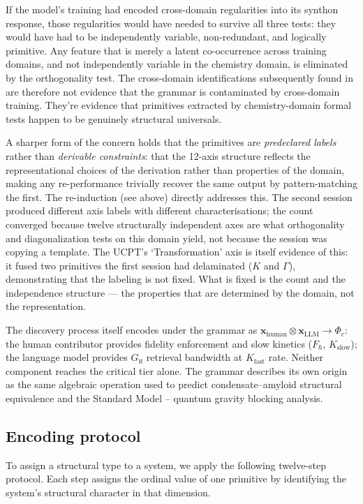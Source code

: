 \documentclass[12pt,a4paper]{article}
\newcommand{\xvec}{\mathbf{x}}
\newcommand{\Phic}{\Phi_c}
\newcommand{\tensor}{\otimes}
\begin{document}
If the model's training had encoded cross-domain regularities into its
synthon response, those regularities would have needed to survive all
three tests: they would have had to be independently variable,
non-redundant, and logically primitive. Any feature that is merely a
latent co-occurrence across training domains, and not independently
variable in the chemistry domain, is eliminated by the orthogonality
test. The cross-domain identifications subsequently found in
 are therefore not evidence that the grammar
is contaminated by cross-domain training. They're evidence that
primitives extracted by chemistry-domain formal tests happen to be
genuinely structural universals.

A sharper form of the concern holds that the primitives are
\emph{predeclared labels} rather than \emph{derivable constraints}:
that the 12-axis structure reflects the representational choices of the
derivation rather than properties of the domain, making any re-performance
trivially recover the same output by pattern-matching the first.
The re-induction (see above) directly addresses this. The second session
produced different axis labels with different characterisations; the count
converged because twelve structurally independent axes are what orthogonality
and diagonalization tests on this domain yield, not because the session was
copying a template. The UCPT's `Transformation' axis is itself evidence of
this: it fused two primitives the first session had delaminated ($K$ and
$\Gamma$), demonstrating that the labeling is not fixed. What is fixed is
the count and the independence structure --- the properties that are
determined by the domain, not the representation.

The discovery process itself encodes under the grammar as
$\xvec_\text{human} \tensor \xvec_\text{LLM} \to \Phic$: the human
contributor provides fidelity enforcement and slow kinetics
($F_\hbar$, $K_\text{slow}$); the language model provides
$G_\aleph$ retrieval bandwidth at $K_\text{fast}$ rate. Neither
component reaches the critical tier alone. The grammar describes
its own origin as the same algebraic operation used to predict
condensate--amyloid structural equivalence and the Standard Model --
quantum gravity blocking analysis.

\subsection{Encoding protocol}

To assign a structural type to a system, we apply the following
twelve-step protocol. Each step assigns the ordinal value of one
primitive by identifying the system's structural character in that
dimension.
\end{document}
